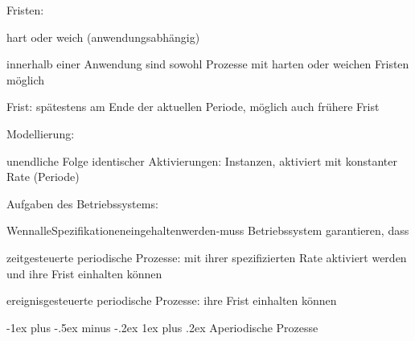 \documentclass[a4paper]{article}
\makeatletter
\renewcommand{\subsubsection}{\@startsection{subsubsection}{3}{0mm}%
 {-1ex plus -.5ex minus -.2ex}%
 {1ex plus .2ex}%
 {\normalfont\small\bfseries}}
\makeatother
\begin{document}
\begin{multicols}{3}
    \begin{itemize*}
        \item
        Fristen:
        \begin{itemize*}
            \item hart oder weich (anwendungsabhängig) \begin{itemize*} \item innerhalb einer Anwendung sind sowohl Prozesse mit harten oder weichen Fristen möglich \item Frist: spätestens am Ende der aktuellen Periode, möglich auch frühere Frist \end{itemize*}
        \end{itemize*}
        \item
        Modellierung:
        \begin{itemize*}
            \item unendliche Folge identischer Aktivierungen: Instanzen, aktiviert mit konstanter Rate (Periode)
        \end{itemize*}
        \item
        Aufgaben des Betriebssystems:
        \begin{itemize*}
            \item WennalleSpezifikationeneingehaltenwerden-muss Betriebssystem garantieren, dass \begin{enumerate*} \item zeitgesteuerte periodische Prozesse: mit ihrer spezifizierten Rate aktiviert werden und ihre Frist einhalten können \item ereignisgesteuerte periodische Prozesse: ihre Frist einhalten können \end{enumerate*}
        \end{itemize*}
    \end{itemize*}


    \subsubsection{Aperiodische Prozesse}


\end{multicols}
\end{document}

